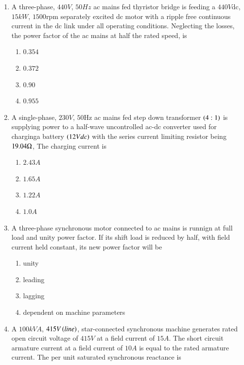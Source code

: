 \documentclass[journal,12pt,twocolumn]{IEEEtran}
\theoremstyle{remark}
\begin{document}
\begin{enumerate}
\begin{multicols}{2}
\begin{enumerate}
    \item $5Hz$
    \item $4Hz$
    \item $2Hz$
\end{enumerate}    
\end{multicols}
\item A three-phase, $440V$, $50Hz$ ac mains fed thyristor bridge is feeding a $440 V$dc, $15kW$, $1500$rpm separately excited dc motor with a ripple free continuous current in the dc link under all operating conditions. Neglecting the losses, the power factor of the ac mains at half the rated speed, is 
\begin{multicols}{2}
\begin{enumerate}
    \item $0.354$
    \item $0.372$
    \item $0.90$
    \item $0.955$
\end{enumerate}    
\end{multicols}
\item A single-phase, $230V$, $50$Hz ac mains fed step down transformer $\left(4:1\right)$ is supplying power to a half-wave uncontrolled ac-dc converter used for charginga battery $\left(12Vdc\right)$ with the series current limiting resistor being $19.04\ohm$, The charging current is
\begin{multicols}{2}
\begin{enumerate}
    \item $2.43A$
    \item $1.65A$
    \item $1.22A$
    \item $1.0A$
\end{enumerate}    
\end{multicols}
\item A three-phase synchronous motor connected to ac mains is runnign at full load and unity power factor. If its shift load is reduced by half, with field current held constant, its new power factor will be 
\begin{enumerate}
    \item unity
    \item leading
    \item lagging
    \item dependent on machine parameters
\end{enumerate}    
\item A $100kVA$, $415V\left(line\right)$, star-connected synchronous machine generates rated open circuit voltage of $415V$ at a field current of $15A$. The short circuit armature current at a field current of $10A$ is equal to the rated armature current. The per unit saturated synchronous reactance is 

\end{enumerate}
\end{document}
